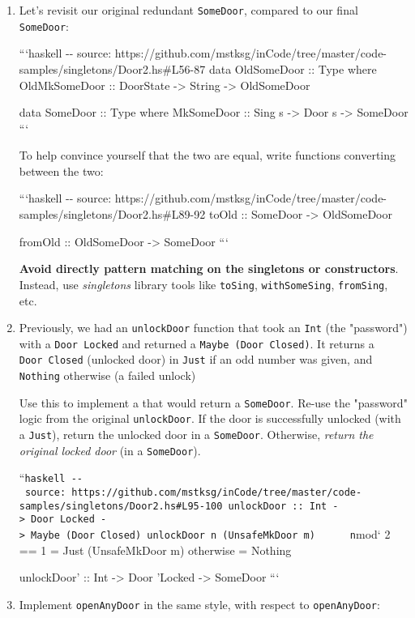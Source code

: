 \documentclass[]{article}
\begin{document}
\begin{enumerate}
\item
  Let's revisit our original redundant \texttt{SomeDoor}, compared to our final
  \texttt{SomeDoor}:

  ```haskell -\/- source:
  https://github.com/mstksg/inCode/tree/master/code-samples/singletons/Door2.hs\#L56-87
  data OldSomeDoor :: Type where OldMkSomeDoor :: DoorState -\textgreater{}
  String -\textgreater{} OldSomeDoor

  data SomeDoor :: Type where MkSomeDoor :: Sing s -\textgreater{} Door s
  -\textgreater{} SomeDoor ```

  To help convince yourself that the two are equal, write functions converting
  between the two:

  ```haskell -\/- source:
  https://github.com/mstksg/inCode/tree/master/code-samples/singletons/Door2.hs\#L89-92
  toOld :: SomeDoor -\textgreater{} OldSomeDoor

  fromOld :: OldSomeDoor -\textgreater{} SomeDoor ```

  \textbf{Avoid directly pattern matching on the singletons or constructors}.
  Instead, use \emph{singletons} library tools like \texttt{toSing},
  \texttt{withSomeSing}, \texttt{fromSing}, etc.
\item
  Previously, we had an \texttt{unlockDoor} function that took an \texttt{Int}
  (the "password") with a \texttt{Door\ \textquotesingle{}Locked} and returned a
  \texttt{Maybe\ (Door\ \textquotesingle{}Closed)}. It returns a
  \texttt{Door\ \textquotesingle{}Closed} (unlocked door) in \texttt{Just} if an
  odd number was given, and \texttt{Nothing} otherwise (a failed unlock)

  Use this to implement a that would return a \texttt{SomeDoor}. Re-use the
  "password" logic from the original \texttt{unlockDoor}. If the door is
  successfully unlocked (with a \texttt{Just}), return the unlocked door in a
  \texttt{SomeDoor}. Otherwise, \emph{return the original locked door} (in a
  \texttt{SomeDoor}).

  ``\texttt{haskell\ -\/-\ source:\ https://github.com/mstksg/inCode/tree/master/code-samples/singletons/Door2.hs\#L95-100\ unlockDoor\ ::\ Int\ -\textgreater{}\ Door\ \textquotesingle{}Locked\ -\textgreater{}\ Maybe\ (Door\ \textquotesingle{}Closed)\ unlockDoor\ n\ (UnsafeMkDoor\ m)\ \ \ \ \ \textbar{}\ n}mod`
  2 == 1 = Just (UnsafeMkDoor m) \textbar{} otherwise = Nothing

  unlockDoor' :: Int -\textgreater{} Door 'Locked -\textgreater{} SomeDoor ```
\item
  Implement \texttt{openAnyDoor\textquotesingle{}} in the same style, with
  respect to \texttt{openAnyDoor}:


\end{enumerate}
\end{document}
